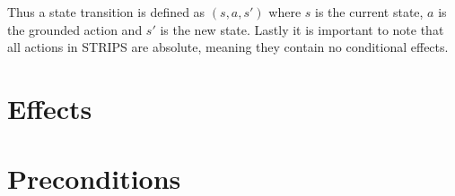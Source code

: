 \documentclass[master.tex]{subfiles}
\begin{document}
    Thus a state transition is defined as $(s,a,s')$ where $s$ is the
    current state, $a$ is the grounded action and $s'$ is the new state.
    Lastly it is important to note that all actions in STRIPS are absolute,
    meaning they contain no conditional effects.

\section{Effects}


\section{Preconditions}

\end{document}
